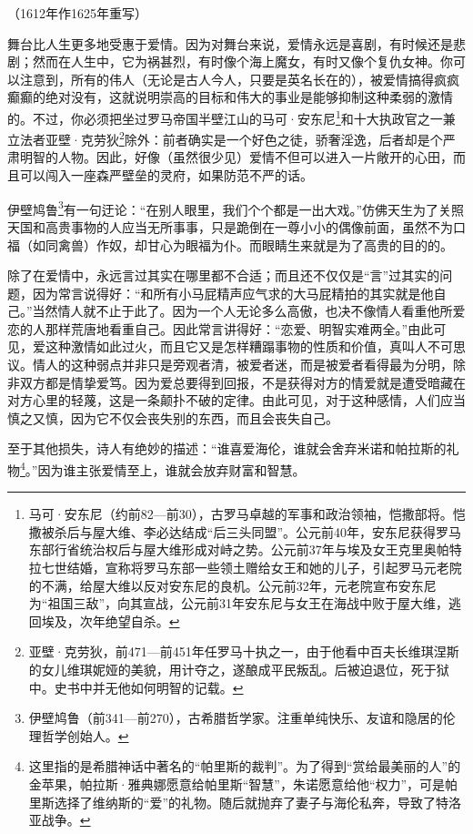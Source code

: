 \begin{center}
    （1612年作1625年重写）
\end{center}
\par 舞台比人生更多地受惠于爱情。因为对舞台来说，爱情永远是喜剧，有时候还是悲剧；然而在人生中，它为祸甚烈，有时像个海上魔女，有时又像个复仇女神。你可以注意到，所有的伟人（无论是古人今人，只要是英名长在的），被爱情搞得疯疯癫癫的绝对没有，这就说明崇高的目标和伟大的事业是能够抑制这种柔弱的激情的。不过，你必须把坐过罗马帝国半壁江山的马可·安东尼\footnote{马可·安东尼（约前82—前30），古罗马卓越的军事和政治领袖，恺撒部将。恺撒被杀后与屋大维、李必达结成“后三头同盟”。公元前40年，安东尼获得罗马东部行省统治权后与屋大维形成对峙之势。公元前37年与埃及女王克里奥帕特拉七世结婚，宣称将罗马东部一些领土赠给女王和她的儿子，引起罗马元老院的不满，给屋大维以反对安东尼的良机。公元前32年，元老院宣布安东尼为“祖国三敌”，向其宣战，公元前31年安东尼与女王在海战中败于屋大维，逃回埃及，次年绝望自杀。}和十大执政官之一兼立法者亚壁·克劳狄\footnote{亚壁·克劳狄，前471—前451年任罗马十执之一，由于他看中百夫长维琪涅斯的女儿维琪妮娅的美貌，用计夺之，遂酿成平民叛乱。后被迫退位，死于狱中。史书中并无他如何明智的记载。}除外：前者确实是一个好色之徒，骄奢淫逸，后者却是个严肃明智的人物。因此，好像（虽然很少见）爱情不但可以进入一片敞开的心田，而且可以闯入一座森严壁垒的灵府，如果防范不严的话。
\par 伊壁鸠鲁\footnote{伊壁鸠鲁（前341—前270），古希腊哲学家。注重单纯快乐、友谊和隐居的伦理哲学创始人。}有一句迂论：“在别人眼里，我们个个都是一出大戏。”仿佛天生为了关照天国和高贵事物的人应当无所事事，只是跪倒在一尊小小的偶像前面，虽然不为口福（如同禽兽）作奴，却甘心为眼福为仆。而眼睛生来就是为了高贵的目的的。
\par 除了在爱情中，永远言过其实在哪里都不合适；而且还不仅仅是“言”过其实的问题，因为常言说得好：“和所有小马屁精声应气求的大马屁精拍的其实就是他自己。”当然情人就不止于此了。因为一个人无论多么高傲，也决不像情人看重他所爱恋的人那样荒唐地看重自己。因此常言讲得好：“恋爱、明智实难两全。”由此可见，爱这种激情如此过火，而且它又是怎样糟蹋事物的性质和价值，真叫人不可思议。情人的这种弱点并非只是旁观者清，被爱者迷，而是被爱者看得最为分明，除非双方都是情挚爱笃。因为爱总要得到回报，不是获得对方的情爱就是遭受暗藏在对方心里的轻蔑，这是一条颠扑不破的定律。由此可见，对于这种感情，人们应当慎之又慎，因为它不仅会丧失别的东西，而且会丧失自己。
\par 至于其他损失，诗人有绝妙的描述：“谁喜爱海伦，谁就会舍弃米诺和帕拉斯的礼物\footnote{这里指的是希腊神话中著名的“帕里斯的裁判”。为了得到“赏给最美丽的人”的金苹果，帕拉斯·雅典娜愿意给帕里斯“智慧”，朱诺愿意给他“权力”，可是帕里斯选择了维纳斯的“爱”的礼物。随后就抛弃了妻子与海伦私奔，导致了特洛亚战争。}。”因为谁主张爱情至上，谁就会放弃财富和智慧。
